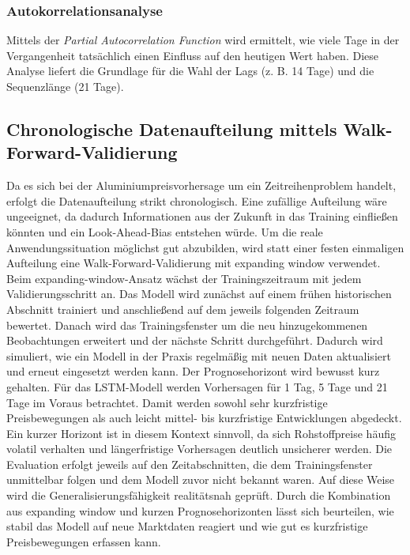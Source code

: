 \subsubsection{Autokorrelationsanalyse}
Mittels der \emph{Partial Autocorrelation Function} wird ermittelt, wie viele Tage in der Vergangenheit tatsächlich einen Einfluss auf den heutigen Wert haben.
Diese Analyse liefert die Grundlage für die Wahl der Lags (z. B. 14 Tage) und die Sequenzlänge (21 Tage).

\subsection{Chronologische Datenaufteilung mittels Walk-Forward-Validierung}
Da es sich bei der Aluminiumpreisvorhersage um ein Zeitreihenproblem handelt, erfolgt die Datenaufteilung strikt chronologisch. Eine zufällige Aufteilung wäre ungeeignet, da dadurch Informationen aus der Zukunft in das Training einfließen könnten und ein Look-Ahead-Bias entstehen würde. Um die reale Anwendungssituation möglichst gut abzubilden, wird statt einer festen einmaligen Aufteilung eine Walk-Forward-Validierung mit expanding window verwendet. \cite{lookahead_bias_ts, matlab_expanding_window}
Beim expanding-window-Ansatz wächst der Trainingszeitraum mit jedem Validierungsschritt an. Das Modell wird zunächst auf einem frühen historischen Abschnitt trainiert und anschließend auf dem jeweils folgenden Zeitraum bewertet. Danach wird das Trainingsfenster um die neu hinzugekommenen Beobachtungen erweitert und der nächste Schritt durchgeführt. Dadurch wird simuliert, wie ein Modell in der Praxis regelmäßig mit neuen Daten aktualisiert und erneut eingesetzt werden kann.
Der Prognosehorizont wird bewusst kurz gehalten. Für das LSTM-Modell werden Vorhersagen für 1 Tag, 5 Tage und 21 Tage im Voraus betrachtet. Damit werden sowohl sehr kurzfristige Preisbewegungen als auch leicht mittel- bis kurzfristige Entwicklungen abgedeckt. Ein kurzer Horizont ist in diesem Kontext sinnvoll, da sich Rohstoffpreise häufig volatil verhalten und längerfristige Vorhersagen deutlich unsicherer werden.
Die Evaluation erfolgt jeweils auf den Zeitabschnitten, die dem Trainingsfenster unmittelbar folgen und dem Modell zuvor nicht bekannt waren. Auf diese Weise wird die Generalisierungsfähigkeit realitätsnah geprüft. Durch die Kombination aus expanding window und kurzen Prognosehorizonten lässt sich beurteilen, wie stabil das Modell auf neue Marktdaten reagiert und wie gut es kurzfristige Preisbewegungen erfassen kann.